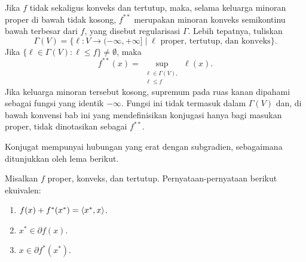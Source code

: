 \begin{rem}
    Jika $f$ tidak sekaligus konveks dan tertutup, maka, selama keluarga minoran proper di bawah tidak kosong, $f^{**}$ merupakan minoran konveks semikontinu bawah terbesar dari $f$, yang disebut regularisasi $\Gamma$. Lebih tepatnya, tuliskan
    \begin{equation}
        \Gamma(V)=\{\ell:V\rightarrow(-\infty,+\infty]\;|\; \ell\text{ proper, tertutup, dan konveks}\}.
    \end{equation}
    Jika $\{\ell\in\Gamma(V):\ell\leq f\}\neq\emptyset$, maka
    \begin{equation}
        f^{**}(x) = \sup_{\substack{\ell\in \Gamma(V),\\
        \ell\leq f}}\ell (x).
    \end{equation}
    Jika keluarga minoran tersebut kosong, supremum pada ruas kanan dipahami sebagai fungsi yang identik $-\infty$. Fungsi ini tidak termasuk dalam $\Gamma(V)$ dan, di bawah konvensi bab ini yang mendefinisikan konjugasi hanya bagi masukan proper, tidak dinotasikan sebagai $f^{**}$.
\end{rem}
Konjugat mempunyai hubungan yang erat dengan subgradien, sebagaimana ditunjukkan oleh lema berikut.
\begin{lemma}\label{duality:lemma:subdiff_conjugate}
    Misalkan $f$ proper, konveks, dan tertutup. Pernyataan-pernyataan berikut ekuivalen:
    \begin{enumerate}
        \item $f(x) + f^*(x^*) = \left\langle x^* , x\right\rangle$.\label{duality:item1}
        \item $x^*\in \partial f(x)$.\label{duality:item2}
        \item $x\in \partial f^*(x^*)$.\label{duality:item3}
    \end{enumerate}
\end{lemma}
